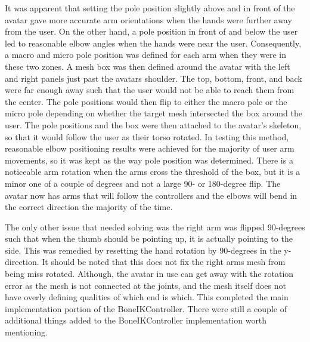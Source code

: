 \documentclass{vgtc}                          %
\begin{document}
It was apparent that setting the pole position slightly above and in front of the avatar gave more accurate arm orientations when the hands were further away from the user. On the other hand, a pole position in front of and below the user led to reasonable elbow angles when the hands were near the user. Consequently, a macro and micro pole position was defined for each arm when they were in these two zones. A mesh box was then defined around the avatar with the left and right panels just past the avatars shoulder. The top, bottom, front, and back were far enough away such that the user would not be able to reach them from the center. The pole positions would then flip to either the macro pole or the micro pole depending on whether the target mesh intersected the box around the user. The pole positions and the box were then attached to the avatar’s skeleton, so that it would follow the user as their torso rotated. In testing this method, reasonable elbow positioning results were achieved for the majority of user arm movements, so it was kept as the way pole position was determined. There is a noticeable arm rotation when the arms cross the threshold of the box, but it is a minor one of a couple of degrees and not a large 90- or 180-degree flip. The avatar now has arms that will follow the controllers and the elbows will bend in the correct direction the majority of the time. 

The only other issue that needed solving was the right arm was flipped 90-degrees such that when the thumb should be pointing up, it is actually pointing to the side. This was remedied by resetting the hand rotation by 90-degrees in the y-direction. It should be noted that this does not fix the right arms mesh from being miss rotated. Although, the avatar in use can get away with the rotation error as the mesh is not connected at the joints, and the mesh itself does not have overly defining qualities of which end is which. This completed the main implementation portion of the BoneIKController. There were still a couple of additional things added to the BoneIKController implementation worth mentioning.
\end{document}
